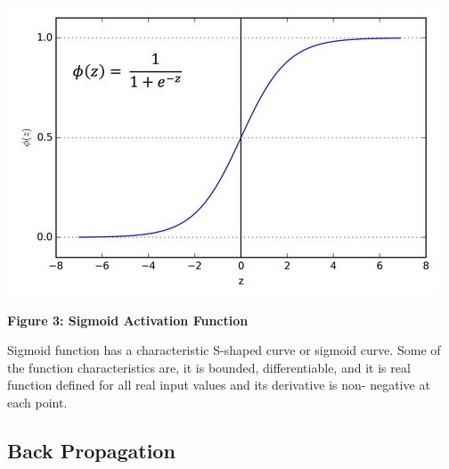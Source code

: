 \begin{center}
\includegraphics[scale=0.35]{images/sigmoid-activation-function.jpeg}\label{s:Sigmoid-function}
\end{center}
\textbf{Figure 3: Sigmoid Activation Function
~\cite{hid-sp18-401-sigmoid-activation-function}}

Sigmoid function has a characteristic S-shaped curve or sigmoid curve. Some of
the function characteristics are, it is bounded, differentiable, and it is
real function defined for all real input values and its derivative is non-
negative at each point.




\subsection{Back Propagation}

